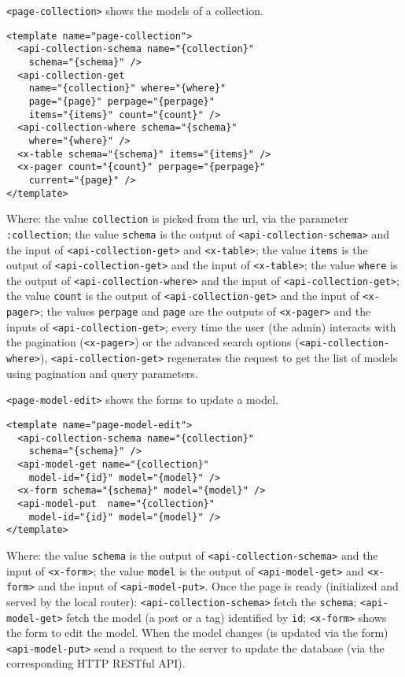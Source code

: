 \vspace{0.2cm}

\texttt{<page-collection>} shows the models of a collection.

\begin{lstlisting}[language=HTML5]
<template name="page-collection">
  <api-collection-schema name="{collection}"
    schema="{schema}" />
  <api-collection-get 
    name="{collection}" where="{where}" 
    page="{page}" perpage="{perpage}"  
    items="{items}" count="{count}" />
  <api-collection-where schema="{schema}"
    where="{where}" />
  <x-table schema="{schema}" items="{items}" />
  <x-pager count="{count}" perpage="{perpage}"
    current="{page}" />
</template>
\end{lstlisting}

Where: 
the value \texttt{collection} is picked from the url, via the parameter \texttt{:collection};
the value \texttt{schema} is the output of \texttt{<api-collection-schema>} and the input of \texttt{<api-collection-get>} and \texttt{<x-table>};
the value \texttt{items} is the output of \texttt{<api-collection-get>} and the input of \texttt{<x-table>};
the value \texttt{where} is the output of \texttt{<api-collection-where>} and the input of \texttt{<api-collection-get>};
the value \texttt{count} is the output of \texttt{<api-collection-get>} and the input of \texttt{<x-pager>};
the values \texttt{perpage} and \texttt{page} are the outputs of \texttt{<x-pager>} and the inputs of \texttt{<api-collection-get>};
every time the user (the admin) interacts with the pagination (\texttt{<x-pager>}) or the advanced search options (\texttt{<api-collection-where>}), \texttt{<api-collection-get>} regenerates the request to get the list of models using pagination and query parameters.

\vspace{0.2cm}

\texttt{<page-model-edit>} shows the forms to update a model.

\begin{lstlisting}[language=HTML5]
<template name="page-model-edit">
  <api-collection-schema name="{collection}"
    schema="{schema}" />
  <api-model-get name="{collection}" 
    model-id="{id}" model="{model}" />
  <x-form schema="{schema}" model="{model}" />
  <api-model-put  name="{collection}"
    model-id="{id}" model="{model}" />
</template>
\end{lstlisting}

Where: 
the value \texttt{schema} is the output of \texttt{<api-collection-schema>} and the input of \texttt{<x-form>};
the value \texttt{model} is the output of \texttt{<api-model-get>} and \texttt{<x-form>} and the input of \texttt{<api-model-put>}.
Once the page is ready (initialized and served by the local router): 
\texttt{<api-collection-schema>} fetch the \texttt{schema}; 
\texttt{<api-model-get>} fetch the model (a post or a tag) identified by \texttt{id};
\texttt{<x-form>} shows the form to edit the model.
When the model changes (is updated via the form) \texttt{<api-model-put>} send a request to the server to update the database (via the corresponding HTTP RESTful API).

